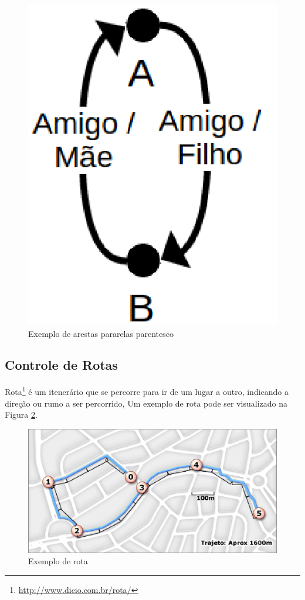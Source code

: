 \begin{figure}[!h]
	\centering
	\includegraphics[scale=0.45]{figuras/capitulo5/parentes.eps}
	\caption{Exemplo de arestas pararelas parentesco}
	\label{parentes}
\end{figure}

\subsection{Controle de Rotas}

Rota\footnote{\url{http://www.dicio.com.br/rota/}} é um itenerário que se percorre para ir de um lugar a outro, indicando a direção ou rumo a ser percorrido, Um exemplo de rota pode ser visualizado na Figura \ref{rota}.

\begin{figure}[!h]
	\centering
	\includegraphics[scale=0.55]{figuras/capitulo5/rota.eps}
	\caption[Exemplo de rota]{Exemplo de rota\footnotemark}
	\label{rota}
\end{figure}

